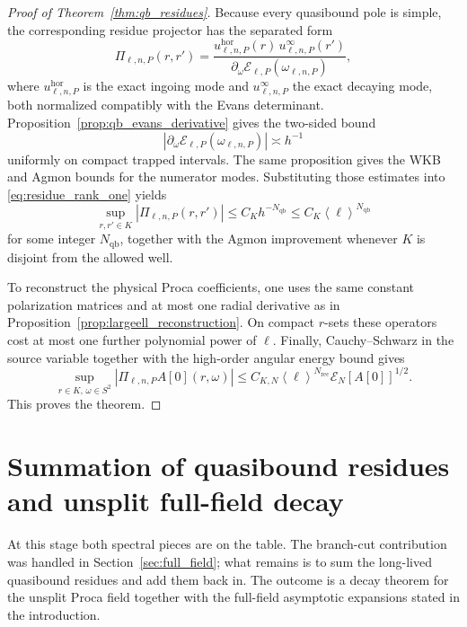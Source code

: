 \documentclass[12pt]{article}
\numberwithin{equation}{section}
\theoremstyle{plain}
\theoremstyle{definition}
\theoremstyle{remark}
\newcommand{\qb}{\mathrm{qb}}
\newcommand{\hor}{\mathrm{hor}}
\newcommand{\cE}{\mathcal E}
\newcommand{\angles}[1]{\left\langle #1 \right\rangle}
\newcommand{\abs}[1]{\left|#1\right|}
\begin{document}
\begin{proof}[Proof of Theorem~\ref{thm:qb_residues}]
Because every quasibound pole is simple, the corresponding residue projector has the separated form
\begin{equation}\label{eq:residue_rank_one}
   \Pi_{\ell,n,P}(r,r')
   =
   \frac{u^{\hor}_{\ell,n,P}(r)\,u^{\infty}_{\ell,n,P}(r')}{\partial_\omega\cE_{\ell,P}(\omega_{\ell,n,P})},
\end{equation}
where $u^{\hor}_{\ell,n,P}$ is the exact ingoing mode and $u^{\infty}_{\ell,n,P}$ the exact decaying mode, both normalized compatibly with the Evans determinant.  Proposition~\ref{prop:qb_evans_derivative} gives the two-sided bound
\begin{equation}\label{eq:evans_derivative_bound}
   \abs{\partial_\omega\cE_{\ell,P}(\omega_{\ell,n,P})}
   \asymp h^{-1}
\end{equation}
uniformly on compact trapped intervals.  The same proposition gives the WKB and Agmon bounds for the numerator modes.  Substituting those estimates into \eqref{eq:residue_rank_one} yields
\[
   \sup_{r,r'\in K}\abs{\Pi_{\ell,n,P}(r,r')}
   \le C_K h^{-N_{\qb}}
   \le C_K\angles{\ell}^{N_{\qb}}
\]
for some integer $N_{\qb}$, together with the Agmon improvement whenever $K$ is disjoint from the allowed well.

To reconstruct the physical Proca coefficients, one uses the same constant polarization matrices and at most one radial derivative as in Proposition~\ref{prop:largeell_reconstruction}.  On compact $r$-sets these operators cost at most one further polynomial power of $\ell$.  Finally, Cauchy--Schwarz in the source variable together with the high-order angular energy bound gives
\[
   \sup_{r\in K,\,\omega\in S^2}\abs{\Pi_{\ell,n,P}A[0](r,\omega)}
   \le
   C_{K,N}\angles{\ell}^{N_{\mathrm{rec}}}\mathcal E_N[A[0]]^{1/2}.
\]
This proves the theorem.
\end{proof}

\section{Summation of quasibound residues and unsplit full-field decay}\label{sec:unsplit}

At this stage both spectral pieces are on the table.  The branch-cut contribution was handled in Section~\ref{sec:full_field}; what remains is to sum the long-lived quasibound residues and add them back in.  The outcome is a decay theorem for the unsplit Proca field together with the full-field asymptotic expansions stated in the introduction.
\end{document}
